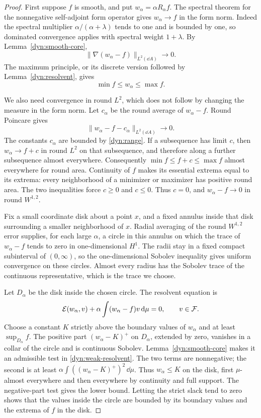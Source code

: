 \begin{proof}
First suppose $f$ is smooth, and put $w_\alpha=\alpha R_\alpha f$.
The spectral theorem for the nonnegative self-adjoint form operator
gives $w_\alpha\to f$ in the form norm.  Indeed the spectral
multiplier $\alpha/(\alpha+\lambda)$ tends to one and is bounded by
one, so dominated convergence applies with spectral weight
$1+\lambda$.  By Lemma~\ref{dyn:smooth-core},
\[
 \|\nabla(w_\alpha-f)\|_{L^2(\dd A)}\longrightarrow0.
\]
The maximum principle, or its discrete version followed by
Lemma~\ref{dyn:resolvent}, gives
\begin{equation}\label{dyn:range}
 \min f\le w_\alpha\le\max f.
\end{equation}

We also need convergence in round $L^2$, which does not follow by
changing the measure in the form norm.  Let $c_\alpha$ be the round
average of $w_\alpha-f$.  Round Poincare gives
\[
 \|w_\alpha-f-c_\alpha\|_{L^2(\dd A)}\longrightarrow0.
\]
The constants $c_\alpha$ are bounded by \eqref{dyn:range}.  If a
subsequence has limit $c$, then $w_\alpha\to f+c$ in round $L^2$
on that subsequence, and therefore along a further subsequence almost
everywhere.  Consequently
$\min f\le f+c\le\max f$ almost everywhere for round area.
Continuity of $f$ makes its essential extrema equal to its extrema:
every neighborhood of a minimizer or maximizer has positive round
area.  The two inequalities force $c\ge0$ and $c\le0$.
Thus $c=0$, and $w_\alpha-f\to0$ in round $W^{1,2}$.

Fix a small coordinate disk about a point $x$, and a fixed annulus
inside that disk surrounding a smaller neighborhood of $x$.
Radial averaging of the round $W^{1,2}$ error supplies, for each
large $\alpha$, a circle in this annulus on which the trace of
$w_\alpha-f$ tends to zero in one-dimensional $H^1$.  The radii stay
in a fixed compact subinterval of $(0,\infty)$, so the
one-dimensional Sobolev inequality gives uniform convergence on
these circles.  Almost every radius has the Sobolev trace of the
continuous representative, which is the trace we choose.

Let $D_\alpha$ be the disk inside the chosen circle.  The resolvent
equation is
\begin{equation}\label{dyn:weak-resolvent}
 \mathcal E(w_\alpha,v)+\alpha\int(w_\alpha-f)v\,\mathrm d\mu=0,
 \qquad v\in\mathcal F.
\end{equation}
Choose a constant $K$ strictly above the boundary values of
$w_\alpha$ and at least $\sup_{D_\alpha} f$.
The positive part $(w_\alpha-K)^+$ on $D_\alpha$, extended by zero,
vanishes in a collar of the circle and is continuous Sobolev.
Lemma~\ref{dyn:smooth-core} makes it an admissible test in
\eqref{dyn:weak-resolvent}.  The two terms are nonnegative; the
second is at least $\alpha\int ((w_\alpha-K)^+)^2\,\dd\mu$.
Thus $w_\alpha\le K$ on the disk, first $\mu$-almost everywhere and
then everywhere by continuity and full support.  The negative-part
test gives the lower bound.  Letting the strict slack tend to zero
shows that the values inside the circle are bounded by its boundary
values and the extrema of $f$ in the disk.


\end{proof}
